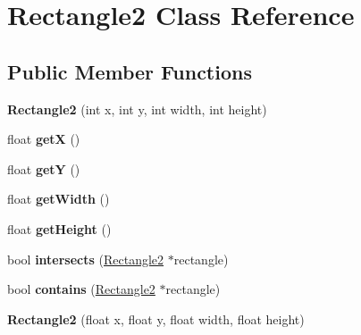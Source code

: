 \hypertarget{class_rectangle2}{}\section{Rectangle2 Class Reference}
\label{class_rectangle2}
\subsection*{Public Member Functions}
\begin{DoxyCompactItemize}
\item 
\hypertarget{class_rectangle2_abfdd8139584e58a6fbeb93fd0a058c4e}{}{\bfseries Rectangle2} (int x, int y, int width, int height)\label{class_rectangle2_abfdd8139584e58a6fbeb93fd0a058c4e}

\item 
\hypertarget{class_rectangle2_a77ea347dfadc86026cd4cbc22961282a}{}float {\bfseries get\+X} ()\label{class_rectangle2_a77ea347dfadc86026cd4cbc22961282a}

\item 
\hypertarget{class_rectangle2_abacea2a11c1f14c36518558725f1f576}{}float {\bfseries get\+Y} ()\label{class_rectangle2_abacea2a11c1f14c36518558725f1f576}

\item 
\hypertarget{class_rectangle2_a70d3c3ca01f1517d4050e454e1cf0407}{}float {\bfseries get\+Width} ()\label{class_rectangle2_a70d3c3ca01f1517d4050e454e1cf0407}

\item 
\hypertarget{class_rectangle2_a04202feecc664c1d260002e6bc211f96}{}float {\bfseries get\+Height} ()\label{class_rectangle2_a04202feecc664c1d260002e6bc211f96}

\item 
\hypertarget{class_rectangle2_a42a1a94338f206ff4b1d3709763c954d}{}bool {\bfseries intersects} (\hyperlink{class_rectangle2}{Rectangle2} $\ast$rectangle)\label{class_rectangle2_a42a1a94338f206ff4b1d3709763c954d}

\item 
\hypertarget{class_rectangle2_a905b7f047177d2374a9a1742ba646a2b}{}bool {\bfseries contains} (\hyperlink{class_rectangle2}{Rectangle2} $\ast$rectangle)\label{class_rectangle2_a905b7f047177d2374a9a1742ba646a2b}

\item 
\hypertarget{class_rectangle2_a9c7a919eb73829f1c42c108d3ba07ef8}{}{\bfseries Rectangle2} (float x, float y, float width, float height)\label{class_rectangle2_a9c7a919eb73829f1c42c108d3ba07ef8}


\end{DoxyCompactItemize}
